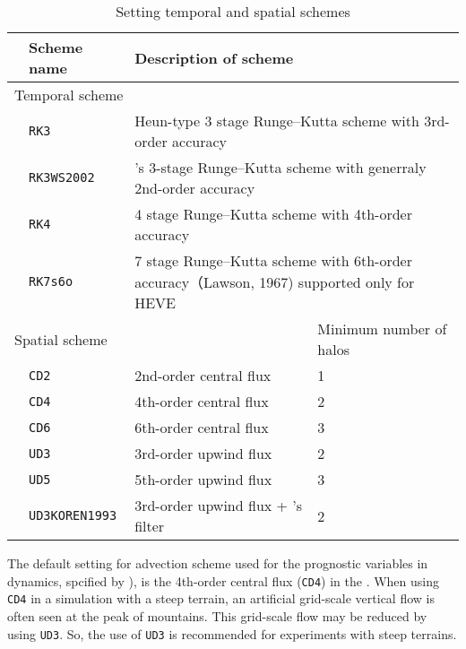 \begin{table}[bth]
\begin{center}
  \caption{Setting temporal and spatial schemes}
  \label{tab:nml_atm_dyn}
  \begin{tabularx}{150mm}{lllX} \hline
    \rowcolor[gray]{0.9} & \multicolumn{1}{l}{Scheme name} & \multicolumn{1}{l}{Description of scheme} & \\ \hline
    \multicolumn{3}{l}{Temporal scheme} &  \\ \hline
    & \multicolumn{1}{l}{\verb|RK3|} & \multicolumn{2}{l}{Heun-type 3 stage Runge--Kutta scheme with 3rd-order accuracy} \\
    & \multicolumn{1}{l}{\verb|RK3WS2002|} & \multicolumn{2}{l}{\citet{Wicker_2002}'s 3-stage Runge--Kutta scheme with generraly 2nd-order accuracy} \\
    & \multicolumn{1}{l}{\verb|RK4|} & \multicolumn{2}{l}{4 stage Runge--Kutta scheme with 4th-order accuracy} \\
    & \multicolumn{1}{l}{\verb|RK7s6o|} & \multicolumn{2}{l}{7 stage Runge--Kutta scheme with 6th-order accuracy（Lawson, 1967) supported only for HEVE} \\
    \hline
    \multicolumn{3}{l}{Spatial scheme} & Minimum number of halos\\ \hline
    & \multicolumn{1}{l}{\verb|CD2|} & \multicolumn{1}{l}{2nd-order central flux} & \multicolumn{1}{l}{1}\\
    & \multicolumn{1}{l}{\verb|CD4|} & \multicolumn{1}{l}{4th-order central flux} & \multicolumn{1}{l}{2}\\
    & \multicolumn{1}{l}{\verb|CD6|} & \multicolumn{1}{l}{6th-order central flux} & \multicolumn{1}{l}{3}\\
    & \multicolumn{1}{l}{\verb|UD3|} & \multicolumn{1}{l}{3rd-order upwind flux} & \multicolumn{1}{l}{2}\\
    & \multicolumn{1}{l}{\verb|UD5|} & \multicolumn{1}{l}{5th-order upwind flux} & \multicolumn{1}{l}{3}\\
    & \multicolumn{1}{l}{\verb|UD3KOREN1993|} & \multicolumn{1}{l}{3rd-order upwind flux + \citet{Koren_1993}'s filter} & \multicolumn{1}{l}{2}\\
\hline
  \end{tabularx}
\end{center}
\end{table}

The default setting for advection scheme used for the prognostic variables in dynamics, spcified by ),
is the 4th-order central flux (\verb|CD4|) in the \scalerm.
When using \verb|CD4| in a simulation with a steep terrain,
an artificial grid-scale vertical flow is often seen at the peak of mountains.
This grid-scale flow may be reduced by using \verb|UD3|.
So, the use of \verb|UD3| is recommended for experiments with steep terrains.


